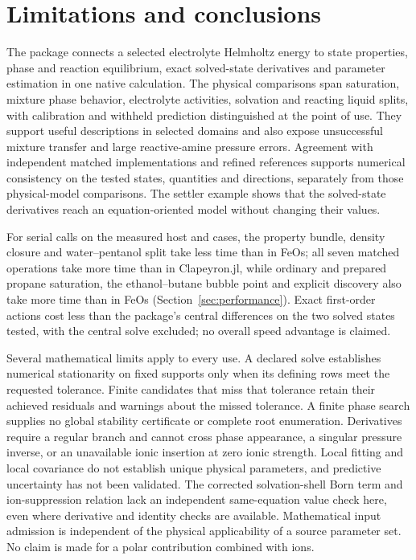 \section{Limitations and conclusions}
\label{sec:conclusions}
The package connects a selected electrolyte Helmholtz energy to state properties, phase and reaction equilibrium, exact solved-state derivatives and parameter estimation in one native calculation.
The physical comparisons span saturation, mixture phase behavior, electrolyte activities, solvation and reacting liquid splits, with calibration and withheld prediction distinguished at the point of use.
They support useful descriptions in selected domains and also expose unsuccessful mixture transfer and large reactive-amine pressure errors.
Agreement with independent matched implementations and refined references supports numerical consistency on the tested states, quantities and directions, separately from those physical-model comparisons.
The settler example shows that the solved-state derivatives reach an equation-oriented model without changing their values.

For serial calls on the measured host and cases, the property bundle, density closure and water--pentanol split take less time than in FeOs; all seven matched operations take more time than in Clapeyron.jl, while ordinary and prepared propane saturation, the ethanol--butane bubble point and explicit discovery also take more time than in FeOs (Section~\ref{sec:performance}).
Exact first-order actions cost less than the package's central differences on the two solved states tested, with the central solve excluded; no overall speed advantage is claimed.

Several mathematical limits apply to every use.
A declared solve establishes numerical stationarity on fixed supports only when its defining rows meet the requested tolerance.
Finite candidates that miss that tolerance retain their achieved residuals and warnings about the missed tolerance.
A finite phase search supplies no global stability certificate or complete root enumeration.
Derivatives require a regular branch and cannot cross phase appearance, a singular pressure inverse, or an unavailable ionic insertion at zero ionic strength.
Local fitting and local covariance do not establish unique physical parameters, and predictive uncertainty has not been validated.
The corrected solvation-shell Born term and ion-suppression relation lack an independent same-equation value check here, even where derivative and identity checks are available.
Mathematical input admission is independent of the physical applicability of a source parameter set.
No claim is made for a polar contribution combined with ions.

